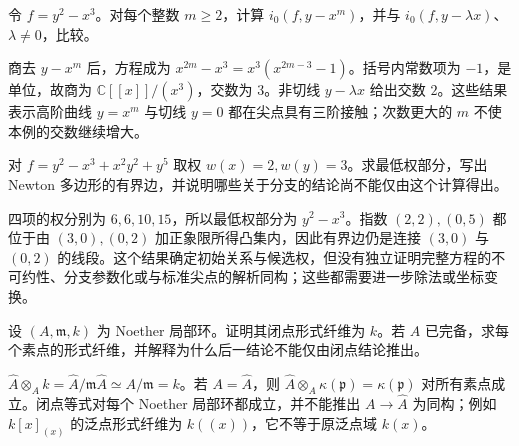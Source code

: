 \begin{exercise}\label{b3:ex:D-cusp-contacts}
	令 \(f=y^2-x^3\)。对每个整数 \(m\ge2\)，计算 \(i_0(f,y-x^m)\)，并与 \(i_0(f,y-\lambda x)\)、\(\lambda\ne0\)，比较。
\end{exercise}
\begin{solution}
	商去 \(y-x^m\) 后，方程成为 \(x^{2m}-x^3=x^3(x^{2m-3}-1)\)。括号内常数项为 \(-1\)，是单位，故商为 \(\mathbb C[\![x]\!]/(x^3)\)，交数为 \(3\)。非切线 \(y-\lambda x\) 给出交数 \(2\)。这些结果表示高阶曲线 \(y=x^m\) 与切线 \(y=0\) 都在尖点具有三阶接触；次数更大的 \(m\) 不使本例的交数继续增大。
\end{solution}

\begin{exercise}\label{b3:ex:D-newton-weight}
	对 \(f=y^2-x^3+x^2y^2+y^5\) 取权 \(w(x)=2,w(y)=3\)。求最低权部分，写出 Newton 多边形的有界边，并说明哪些关于分支的结论尚不能仅由这个计算得出。
\end{exercise}
\begin{solution}
	四项的权分别为 \(6,6,10,15\)，所以最低权部分为 \(y^2-x^3\)。指数 \((2,2),(0,5)\) 都位于由 \((3,0),(0,2)\) 加正象限所得凸集内，因此有界边仍是连接 \((3,0)\) 与 \((0,2)\) 的线段。这个结果确定初始关系与候选权，但没有独立证明完整方程的不可约性、分支参数化或与标准尖点的解析同构；这些都需要进一步除法或坐标变换。
\end{solution}

\begin{exercise}\label{b3:ex:D-formal-fiber-closed}
	设 \((A,\mathfrak m,k)\) 为 Noether 局部环。证明其闭点形式纤维为 \(k\)。若 \(A\) 已完备，求每个素点的形式纤维，并解释为什么后一结论不能仅由闭点结论推出。
\end{exercise}
\begin{solution}
	\(\widehat A\otimes_Ak=\widehat A/\mathfrak m\widehat A\simeq A/\mathfrak m=k\)。若 \(A=\widehat A\)，则 \(\widehat A\otimes_A\kappa(\mathfrak p)=\kappa(\mathfrak p)\) 对所有素点成立。闭点等式对每个 Noether 局部环都成立，并不能推出 \(A\to\widehat A\) 为同构；例如 \(k[x]_{(x)}\) 的泛点形式纤维为 \(k(\!(x)\!)\)，它不等于原泛点域 \(k(x)\)。
\end{solution}

